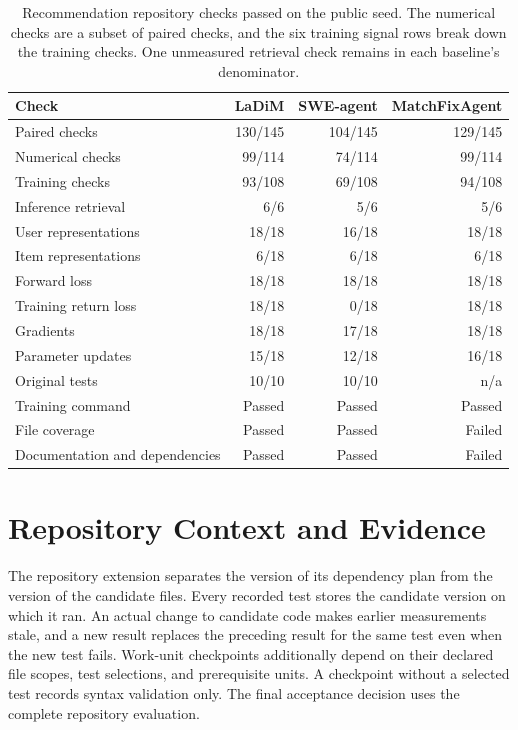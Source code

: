 \documentclass{article}
\begin{document}
\begin{table}[!htb]
\caption{Recommendation repository checks passed on the public seed. The numerical checks are a subset of paired checks, and the six training signal rows break down the training checks. One unmeasured retrieval check remains in each baseline's denominator.}
\label{tab:repository-checks}
\centering
\small
\setlength{\tabcolsep}{4pt}

\begin{tabular*}{\linewidth}{@{\extracolsep{\fill}}lrrr@{}}
\toprule
\textbf{Check} & \textbf{LaDiM} & \textbf{SWE-agent} & \textbf{MatchFixAgent} \\
\midrule
Paired checks & 130/145 & 104/145 & 129/145 \\
Numerical checks & 99/114 & 74/114 & 99/114 \\
Training checks & 93/108 & 69/108 & 94/108 \\
Inference retrieval & 6/6 & 5/6 & 5/6 \\
\midrule
User representations & 18/18 & 16/18 & 18/18 \\
Item representations & 6/18 & 6/18 & 6/18 \\
Forward loss & 18/18 & 18/18 & 18/18 \\
Training return loss & 18/18 & 0/18 & 18/18 \\
Gradients & 18/18 & 17/18 & 18/18 \\
Parameter updates & 15/18 & 12/18 & 16/18 \\
\midrule
Original tests & 10/10 & 10/10 & n/a \\
Training command & Passed & Passed & Passed \\
File coverage & Passed & Passed & Failed \\
Documentation and dependencies & Passed & Passed & Failed \\
\bottomrule
\end{tabular*}


\end{table}

\section{Repository Context and Evidence}
\label{sec:repository-context}

The repository extension separates the version of its dependency plan from the version of the candidate files. Every recorded test stores the candidate version on which it ran. An actual change to candidate code makes earlier measurements stale, and a new result replaces the preceding result for the same test even when the new test fails. Work-unit checkpoints additionally depend on their declared file scopes, test selections, and prerequisite units. A checkpoint without a selected test records syntax validation only. The final acceptance decision uses the complete repository evaluation.
\end{document}
